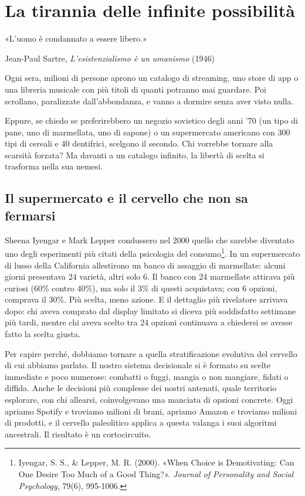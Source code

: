 
\chapter{La tirannia delle infinite possibilità}
\label{cap:p2c21}

\epigraph{«L'uomo è condannato a essere libero.»}{Jean-Paul Sartre, \textit{L'esistenzialismo è un umanismo} (1946)}

Ogni sera, milioni di persone aprono un catalogo di streaming, uno store di app o una libreria musicale con più titoli di quanti potranno mai guardare. Poi scrollano, paralizzate dall'abbondanza, e vanno a dormire senza aver visto nulla.

Eppure, se chiedo se preferirebbero un negozio sovietico degli anni '70 (un tipo di pane, uno di marmellata, uno di sapone) o un supermercato americano con 300 tipi di cereali e 40 dentifrici, scelgono il secondo. Chi vorrebbe tornare alla scarsità forzata? Ma davanti a un catalogo infinito, la libertà di scelta si trasforma nella sua nemesi.

\section{Il supermercato e il cervello che non sa fermarsi}

Sheena Iyengar e Mark Lepper condussero nel 2000 quello che sarebbe diventato uno degli esperimenti più citati della psicologia del consumo\footnote{Iyengar, S. S., \& Lepper, M. R. (2000). «When Choice is Demotivating: Can One Desire Too Much of a Good Thing?». \textit{Journal of Personality and Social Psychology}, 79(6), 995-1006.}. In un supermercato di lusso della California allestirono un banco di assaggio di marmellate: alcuni giorni presentava 24 varietà, altri solo 6. Il banco con 24 marmellate attirava più curiosi (60\% contro 40\%), ma solo il 3\% di questi acquistava; con 6 opzioni, comprava il 30\%. Più scelta, meno azione. E il dettaglio più rivelatore arrivava dopo: chi aveva comprato dal display limitato si diceva più soddisfatto settimane più tardi, mentre chi aveva scelto tra 24 opzioni continuava a chiedersi se avesse fatto la scelta giusta.

Per capire perché, dobbiamo tornare a quella stratificazione evolutiva del cervello di cui abbiamo parlato. Il nostro sistema decisionale si è formato su scelte immediate e poco numerose: combatti o fuggi, mangia o non mangiare, fidati o diffida. Anche le decisioni più complesse dei nostri antenati, quale territorio esplorare, con chi allearsi, coinvolgevano una manciata di opzioni concrete. Oggi apriamo Spotify e troviamo milioni di brani, apriamo Amazon e troviamo milioni di prodotti, e il cervello paleolitico applica a questa valanga i suoi algoritmi ancestrali. Il risultato è un cortocircuito.

